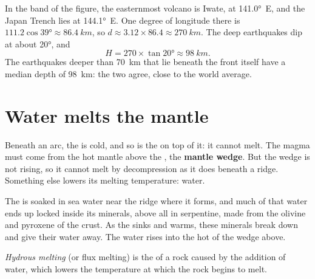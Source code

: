 \begin{example}\label{ex:g12:subduction-magmatism:japan}
In the band of the figure, the easternmost volcano is Iwate, at \ang{141.0}~E,
and the Japan Trench lies at \ang{144.1}~E. One degree of longitude there is
$111.2\cos\ang{39} \approx \qty{86.4}{km}$, so $d \approx 3.12 \times 86.4
\approx \qty{270}{km}$. The deep earthquakes dip at about \ang{20}, and
\[
  H = 270 \times \tan\ang{20} \approx \qty{98}{km}.
\]
The earthquakes deeper than \qty{70}{km} that lie beneath the front itself
have a median depth of \qty{98}{km}: the two agree, close to the world
average.
\end{example}

\section{Water melts the mantle}

Beneath an arc, the  is cold, and so is the  on top of it:
it cannot melt. The magma must come from the hot mantle above the , the
\textbf{mantle wedge}. But the wedge is not rising, so it cannot melt by
decompression as it does beneath a ridge. Something else lowers its melting
temperature: water.

The  is soaked in sea water near the ridge where it forms, and
much of that water ends up locked inside its minerals, above all in
serpentine, made from the olivine and pyroxene of the crust. As the 
sinks and warms, these minerals break down and give their water away. The
water rises into the hot  of the wedge above.

\begin{definition}\label{def:g12:subduction-magmatism:hydrous-melting}
\emph{Hydrous melting} (or flux melting) is the
 of a rock caused by the addition of water, which lowers the
temperature at which the rock begins to melt.
\end{definition}

